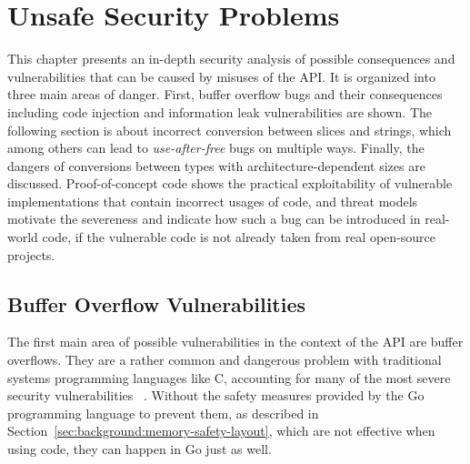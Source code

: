 
\chapter{Unsafe Security Problems}\label{ch:unsafe-security-problems}

This chapter presents an in-depth security analysis of possible consequences and vulnerabilities that can be caused by
misuses of the \unsafe{} \acrshort{API}.
It is organized into three main areas of danger.
First, buffer overflow bugs and their consequences including code injection and information leak vulnerabilities are
shown.
The following section is about incorrect conversion between slices and strings, which among others can lead to
\textit{use-after-free} bugs on multiple ways.
Finally, the dangers of conversions between types with architecture-dependent sizes are discussed.
Proof-of-concept code shows the practical exploitability of vulnerable implementations that contain incorrect usages of
\unsafe{} code, and threat models motivate the severeness and indicate how such a bug can be introduced in real-world
code, if the vulnerable code is not already taken from real open-source projects.





\section{Buffer Overflow Vulnerabilities}\label{sec:unsafe-security-problems:buffer-overflow}

The first main area of possible vulnerabilities in the context of the \unsafe{} \acrshort{API} are buffer overflows.
They are a rather common and dangerous problem with traditional systems programming languages like C, accounting for
many of the most severe security vulnerabilities~\cite{larochelle2001} .
Without the safety measures provided by the Go programming language to prevent them, as described in
Section~\ref{sec:background:memory-safety-layout}, which are not effective when using \unsafe{} code,
they can happen in Go just as well.



